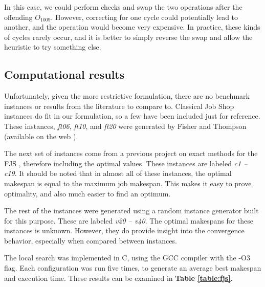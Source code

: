 \documentclass[a4paper,11pt]{article}
\begin{document}
In this case, we could perform checks and swap the two operations after the offending $O_{1009}$. However, correcting for one cycle could potentially lead to another, and the operation would become very expensive. In practice, these kinds of cycles rarely occur, and it is better to simply reverse the swap and allow the heuristic to try something else.

\subsection{Computational results}

Unfortunately, given the more restrictive formulation, there are no benchmark instances or results from the literature to compare to. Classical Job Shop instances do fit in our formulation, so a few have been included just for reference. These instances, \emph{ft06}, \emph{ft10}, and \emph{ft20} were generated by Fisher and Thompson (available on the web \cite{jobshopinfo}).

The next set of instances come from a previous project on exact methods for the FJS \cite{cijvat}, therefore including the optimal values. These instances are labeled \emph{c1 -- c19}. It should be noted that in almost all of these instances, the optimal makespan is equal to the maximum job makespan. This makes it easy to prove optimality, and also much easier to find an optimum.

The rest of the instances were generated using a random instance generator built for this purpose. These are labeled \emph{v20 -- v40}. The optimal makespans for these instances is unknown. However, they do provide insight into the convergence behavior, especially when compared between instances.

The local search was implemented in C, using the GCC compiler with the -O3 flag. Each configuration was run five times, to generate an average best makespan and execution time. These results can be examined in \textbf{Table \ref{table:fjs}}.
\end{document}
